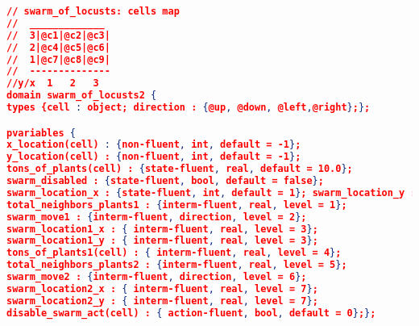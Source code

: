 
\bigskip
\bigskip
\bigskip
\bigskip
\bigskip
\bigskip
\bigskip
\bigskip


\begin{lstlisting}[floatplacement=h,numbersymbol=$:$,language=json,caption={The Locusts Swarm domain in RDDL code.},label={lst:LocustsDomain_RDDL},basicstyle=\tiny]  
// swarm_of_locusts: cells map
//  _____________
//  3|@c1|@c2|@c3|
//  2|@c4|@c5|@c6|
//  1|@c7|@c8|@c9|
//  --------------
//y/x  1   2   3
domain swarm_of_locusts2 {
types {cell : object; direction : {@up, @down, @left,@right};};

pvariables { 
x_location(cell) : {non-fluent, int, default = -1}; 
y_location(cell) : {non-fluent, int, default = -1};
tons_of_plants(cell) : {state-fluent, real, default = 10.0}; 
swarm_disabled : {state-fluent, bool, default = false};
swarm_location_x : {state-fluent, int, default = 1}; swarm_location_y : {state-fluent, int, default = 1}; 
total_neighbors_plants1 : {interm-fluent, real, level = 1}; 
swarm_move1 : {interm-fluent, direction, level = 2};
swarm_location1_x : { interm-fluent, real, level = 3}; 
swarm_location1_y : { interm-fluent, real, level = 3};
tons_of_plants1(cell) : { interm-fluent, real, level = 4}; 
total_neighbors_plants2 : {interm-fluent, real, level = 5};
swarm_move2 : {interm-fluent, direction, level = 6}; 
swarm_location2_x : { interm-fluent, real, level = 7};
swarm_location2_y : { interm-fluent, real, level = 7}; 
disable_swarm_act(cell) : { action-fluent, bool, default = 0};};


\end{lstlisting}
